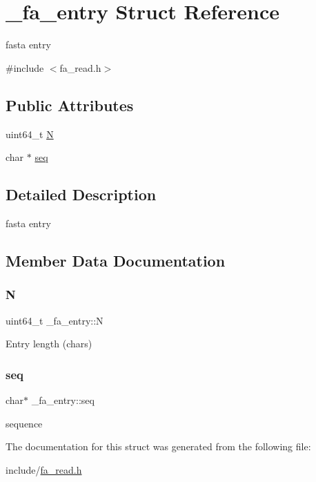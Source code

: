 \hypertarget{struct__fa__entry}{}\section{\+\_\+fa\+\_\+entry Struct Reference}
\label{struct__fa__entry}


fasta entry  




{\ttfamily \#include $<$fa\+\_\+read.\+h$>$}

\subsection*{Public Attributes}
\begin{DoxyCompactItemize}
\item 
uint64\+\_\+t \mbox{\hyperlink{struct__fa__entry_a46bfe034cc419f00fccd2d7d174c76e2}{N}}
\item 
char $\ast$ \mbox{\hyperlink{struct__fa__entry_a6c548e86ed6ce8bb33bd1fcdcd56abbe}{seq}}
\end{DoxyCompactItemize}


\subsection{Detailed Description}
fasta entry 

\subsection{Member Data Documentation}
\mbox{\label{struct__fa__entry_a46bfe034cc419f00fccd2d7d174c76e2}} 
\subsubsection{\texorpdfstring{N}{N}}
{\footnotesize\ttfamily uint64\+\_\+t \+\_\+fa\+\_\+entry\+::N}

Entry length (chars) \mbox{\label{struct__fa__entry_a6c548e86ed6ce8bb33bd1fcdcd56abbe}} 
\subsubsection{\texorpdfstring{seq}{seq}}
{\footnotesize\ttfamily char$\ast$ \+\_\+fa\+\_\+entry\+::seq}

sequence 

The documentation for this struct was generated from the following file\+:\begin{DoxyCompactItemize}
\item 
include/\mbox{\hyperlink{fa__read_8h}{fa\+\_\+read.\+h}}\end{DoxyCompactItemize}
